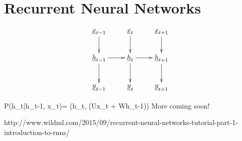\chapter{Recurrent Neural Networks}


\begin{figure}[h!]
\centering
$$\xymatrix{
\rvx_{t-1}\ar[d]&
\rvx_{t}\ar[d]&
\rvx_{t+1}\ar[d]\\
\rvh_{t-1}\ar[d]\ar[r]&
\rvh_{t}\ar[d]\ar[r]&
\rvh_{t+1}\ar[d]\\
\rvy_{t-1}&
\rvy_{t}&
\rvy_{t+1}
}$$
\end{figure}

\beq\color{blue}
P(h_t|h_{t-1}, x_t)=
\delta(h_t,
\cala(Ux_t + Wh_{t-1}))
\eeq
More coming soon!

http://www.wildml.com/2015/09/recurrent-neural-networks-tutorial-part-1-introduction-to-rnns/